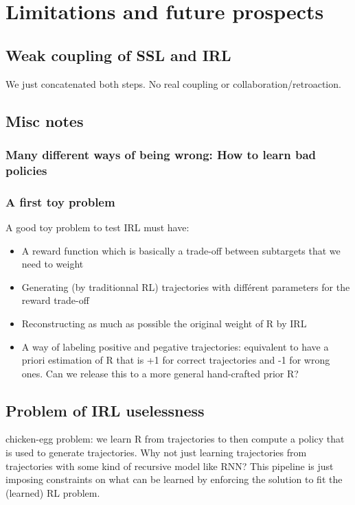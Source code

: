 \documentclass{article}
\begin{document}
\section{Limitations and future prospects \label{sec:limitations}}


\subsection{Weak coupling of SSL and IRL}

We just concatenated both steps. No real coupling or collaboration/retroaction.

\subsection{Misc notes}

\subsubsection{Many different ways of being wrong: How to learn bad policies}

\subsubsection{A first toy problem}

A good toy problem to test IRL must have:

\begin{itemize}
    \item A reward function which is basically a trade-off between subtargets that we need to weight
    \item Generating (by traditionnal RL) trajectories with différent parameters for the reward trade-off
    \item Reconstructing as much as possible the original weight of R by IRL
    \item A way of labeling positive and pegative trajectories: equivalent to have a priori estimation of R that is +1 for correct trajectories and -1 for wrong ones. Can we release this to a more general hand-crafted prior R?
\end{itemize}

\subsection{Problem of IRL uselessness}

chicken-egg problem: we learn R from trajectories to then compute a policy that is used to generate trajectories. Why not just learning trajectories from trajectories with some kind of recursive model like RNN? This pipeline is just imposing constraints on what can be learned by enforcing the solution to fit the (learned) RL problem.
\end{document}
